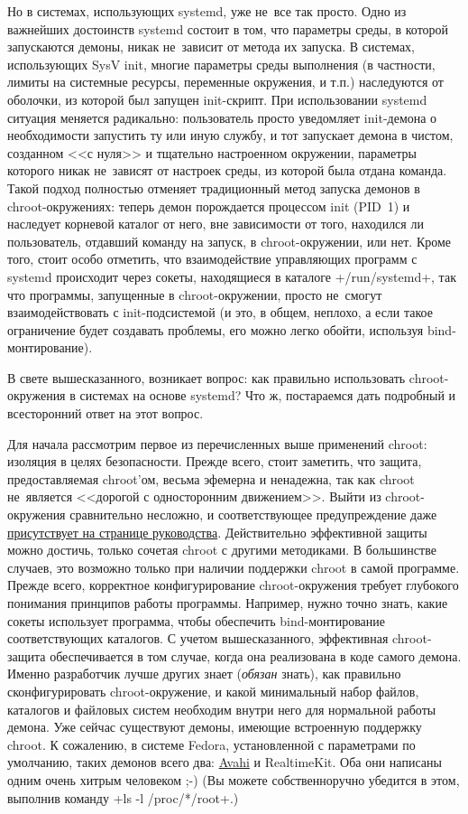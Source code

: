 \documentclass[10pt,oneside,a4paper]{article}
\begin{document}
Но в системах, использующих systemd, уже не~все так просто. Одно из важнейших
достоинств systemd состоит в том, что параметры среды, в которой запускаются
демоны, никак не~зависит от метода их запуска. В системах, использующих SysV
init, многие параметры среды выполнения (в частности, лимиты на системные
ресурсы, переменные окружения, и т.п.) наследуются от оболочки, из которой был
запущен init-скрипт. При использовании systemd ситуация меняется радикально:
пользователь просто уведомляет init-демона о необходимости запустить ту или иную
службу, и тот запускает демона в чистом, созданном <<с нуля>> и тщательно
настроенном окружении, параметры которого никак не~зависят от настроек среды, из
которой была отдана команда. Такой подход полностью отменяет традиционный метод
запуска демонов в chroot-окружениях: теперь демон порождается процессом init
(PID~1) и наследует корневой каталог от него, вне зависимости от того, находился
ли пользователь, отдавший команду на запуск, в chroot-окружении, или нет. Кроме
того, стоит особо отметить, что взаимодействие управляющих программ с systemd
происходит через сокеты, находящиеся в каталоге +/run/systemd+, так что
программы, запущенные в chroot-окружении, просто не~смогут взаимодействовать с
init-подсистемой (и это, в общем, неплохо, а если такое ограничение будет
создавать проблемы, его можно легко обойти, используя bind-монтирование).

В свете вышесказанного, возникает вопрос: как правильно использовать
chroot-окружения в системах на основе systemd? Что ж, постараемся дать подробный
и всесторонний ответ на этот вопрос.

Для начала рассмотрим первое из перечисленных выше применений chroot: изоляция в
целях безопасности. Прежде всего, стоит заметить, что защита, предоставляемая
chroot'ом, весьма эфемерна и ненадежна, так как chroot не~является <<дорогой с
односторонним движением>>. Выйти из chroot-окружения сравнительно несложно, и
соответствующее предупреждение даже
\href{http://linux.die.net/man/2/chroot}{присутствует на странице руководства}.
Действительно эффективной защиты можно достичь, только сочетая chroot с другими
методиками. В большинстве случаев, это возможно только при наличии поддержки
chroot в самой программе. Прежде всего, корректное конфигурирование
chroot-окружения требует глубокого понимания принципов работы программы.
Например, нужно точно знать, какие сокеты использует программа, чтобы обеспечить
bind-монтирование соответствующих каталогов. С учетом вышесказанного,
эффективная chroot-защита обеспечивается в том случае, когда она реализована в
коде самого демона. Именно разработчик лучше других знает (\emph{обязан} знать),
как правильно сконфигурировать chroot-окружение, и какой минимальный набор
файлов, каталогов и файловых систем необходим внутри него для нормальной работы
демона. Уже сейчас существуют демоны, имеющие встроенную поддержку chroot.
К сожалению, в системе Fedora, установленной с параметрами по умолчанию, таких
демонов всего два: \href{http://avahi.org/}{Avahi} и RealtimeKit. Оба они
написаны одним очень хитрым человеком ;-) (Вы можете собственноручно
убедится в этом, выполнив команду +ls -l /proc/*/root+.)
\end{document}
